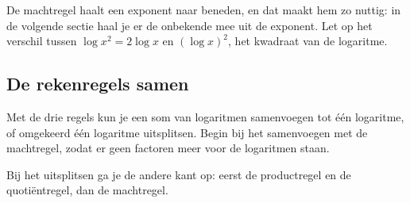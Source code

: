 De machtregel haalt een exponent naar beneden, en dat maakt hem zo nuttig: in de volgende sectie haal je er de onbekende mee uit de exponent. Let op het verschil tussen $\log x^2 = 2\log x$ en $(\log x)^2$, het kwadraat van de logaritme.


\begin{oefeningen}
\end{oefeningen}

\subsection{De rekenregels samen}

Met de drie regels kun je een som van logaritmen samenvoegen tot één logaritme, of omgekeerd één logaritme uitsplitsen. Begin bij het samenvoegen met de machtregel, zodat er geen factoren meer voor de logaritmen staan.


\begin{oefeningen}
\end{oefeningen}

Bij het uitsplitsen ga je de andere kant op: eerst de productregel en de quotiëntregel, dan de machtregel.

